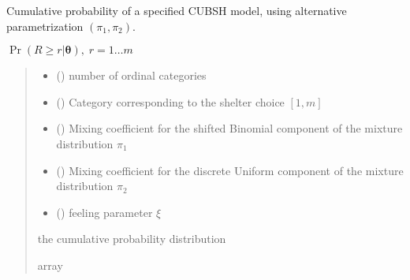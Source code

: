 \documentclass[letterpaper,10pt,english]{sphinxmanual}
\begin{document}

\begin{fulllineitems}
\label{\detokenize{cubmods:cubmods.cubsh.cmf}}
\pysigstartsignatures
{}
\pysigstopsignatures
\sphinxAtStartPar
Cumulative probability of a specified CUBSH model,
using alternative parametrization \((\pi_1, \pi_2)\).

\sphinxAtStartPar
\(\Pr(R \geq r | \pmb\theta),\; r=1 \ldots m\)
\begin{quote}\begin{description}
\begin{itemize}
\item {} 
\sphinxAtStartPar
{} () \textendash{} number of ordinal categories

\item {} 
\sphinxAtStartPar
{} () \textendash{} Category corresponding to the shelter choice \([1,m]\)

\item {} 
\sphinxAtStartPar
{} () \textendash{} Mixing coefficient for the shifted Binomial component of the mixture distribution \(\pi_1\)

\item {} 
\sphinxAtStartPar
{} () \textendash{} Mixing coefficient for the discrete Uniform component of the mixture distribution \(\pi_2\)

\item {} 
\sphinxAtStartPar
{} () \textendash{} feeling parameter \(\xi\)

\end{itemize}

\sphinxAtStartPar
the cumulative probability distribution

\sphinxAtStartPar
array

\end{description}\end{quote}

\end{fulllineitems}
\end{document}
